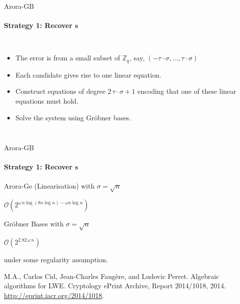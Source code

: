 \documentclass[10pt,compress]{beamer}
\newcommand{\vs}{\vspace{5mm}}
\renewcommand{\vec}[1]{\mathbf{#1}\xspace}
\newcommand{\Zq}{\ensuremath{\Z_q}\xspace}
\renewcommand{\vec}[1]{\mathbf{#1}\xspace}
\newcommand{\Z}{\ensuremath{\mathbb{Z}}\xspace}
\newcommand{\bigO}[1]{\ensuremath{\mathcal{O}\left(#1\right)}\xspace}
\begin{document}
\begin{frame}{Arora-GB}
  \framesubtitle{Strategy 1: Recover $\vec{s}$}

  \begin{columns}
    \begin{itemize}
    \item The error is from a small subset of $\Zq$, say, $(-\tau \cdot \sigma,\dots,\tau \cdot \sigma)$
    \item Each candidate gives rise to one linear equation.
    \item Construct equations of degree $2\,\tau \cdot \sigma +1$ encoding that one of these linear equations must hold.
    \item Solve the system using Gröbner bases.
    \end{itemize}
  \end{columns}
\end{frame}


\begin{frame}{Arora-GB}
  \framesubtitle{Strategy 1: Recover $\vec{s}$}
  \alert{Arora-Ge} (Linearisation) with $\sigma = \sqrt{n}$
  \begin{center}
    \Large $\bigO{2^{\omega\,n\log( 8n \log n) - \omega n \log n}}$
  \end{center}
  \phantom{under some regularity assumption.}

  \alert{Gröbner Bases} with $\sigma = \sqrt{n}$
  \begin{center}
    \Large $\bigO{2^{2.82\,\omega\,n}}$
  \end{center}
  under some regularity assumption.

  \vs{}

  \begin{thebibliography}{foobar}
    M.A., Carlos Cid, Jean-Charles Faug{\`e}re, and Ludovic Perret.
    \newblock Algebraic algorithms for {LWE}.
    \newblock Cryptology ePrint Archive, Report 2014/1018, 2014.
    \newblock \url{http://eprint.iacr.org/2014/1018}.
  \end{thebibliography}

\end{frame}
\end{document}
